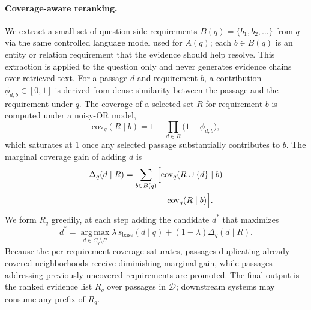 \paragraph{Coverage-aware reranking.}
We extract a small set of question-side requirements
$B(q)=\{b_1,b_2,\ldots\}$ from $q$ via the same controlled language model
used for $A(q)$; each $b\in B(q)$ is an entity or relation requirement
that the evidence should help resolve. This extraction is applied to the
question only and never generates evidence chains over retrieved text.
For a passage $d$ and requirement $b$, a contribution
$\phi_{d,b}\in[0,1]$ is derived from dense similarity between the
passage and the requirement under $q$. The coverage of a selected set
$R$ for requirement $b$ is computed under a noisy-OR model,
\begin{equation}
\label{eq:noisy-or}
\mathrm{cov}_q(R \mid b)
=
1 - \prod_{d \in R}\bigl(1 - \phi_{d,b}\bigr),
\end{equation}
which saturates at $1$ once any selected passage substantially
contributes to $b$. The marginal coverage gain of adding $d$ is
\begin{equation}
\label{eq:marginal-gain}
\begin{aligned}
\Delta_q(d \mid R)
=
\sum_{b \in B(q)}
&\Bigl[
\mathrm{cov}_q(R \cup \{d\} \mid b) \\
&-\mathrm{cov}_q(R \mid b)
\Bigr].
\end{aligned}
\end{equation}
We form $R_q$ greedily, at each step adding the candidate $d^*$ that
maximizes
\begin{equation}
\label{eq:greedy-rerank}
d^{*}
=
\operatorname*{arg\,max}_{d \in C_q \setminus R}
\lambda\,s_{\mathrm{base}}(d \mid q)
+
(1-\lambda)\Delta_q(d \mid R).
\end{equation}
Because the per-requirement coverage saturates, passages duplicating
already-covered neighborhoods receive diminishing marginal gain, while
passages addressing previously-uncovered requirements are promoted. The
final output is the ranked evidence list $R_q$ over passages in
$\mathcal{D}$; downstream systems may consume any prefix of $R_q$.
